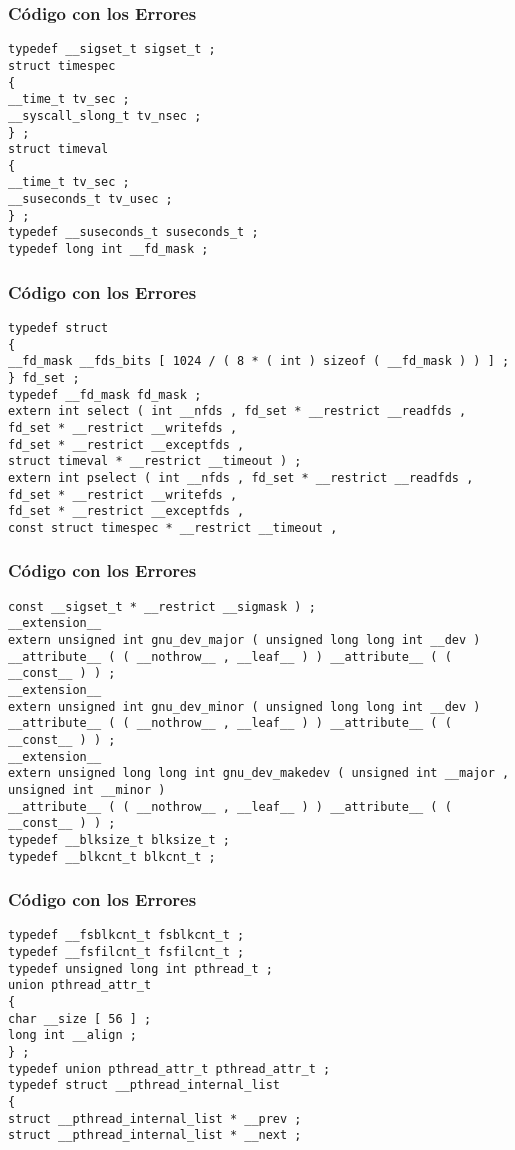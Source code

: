 \documentclass{beamer}
\begin{document}
\begin{frame}[fragile]
\frametitle{C\'odigo con los Errores}
\begin{lstlisting}[style=CStyle]
typedef __sigset_t sigset_t ; 
struct timespec 
{ 
__time_t tv_sec ; 
__syscall_slong_t tv_nsec ; 
} ; 
struct timeval 
{ 
__time_t tv_sec ; 
__suseconds_t tv_usec ; 
} ; 
typedef __suseconds_t suseconds_t ; 
typedef long int __fd_mask ; 
\end{lstlisting}
\end{frame}
\begin{frame}[fragile]
\frametitle{C\'odigo con los Errores}
\begin{lstlisting}[style=CStyle]
typedef struct 
{ 
__fd_mask __fds_bits [ 1024 / ( 8 * ( int ) sizeof ( __fd_mask ) ) ] ; 
} fd_set ; 
typedef __fd_mask fd_mask ; 
extern int select ( int __nfds , fd_set * __restrict __readfds , 
fd_set * __restrict __writefds , 
fd_set * __restrict __exceptfds , 
struct timeval * __restrict __timeout ) ; 
extern int pselect ( int __nfds , fd_set * __restrict __readfds , 
fd_set * __restrict __writefds , 
fd_set * __restrict __exceptfds , 
const struct timespec * __restrict __timeout , 
\end{lstlisting}
\end{frame}
\begin{frame}[fragile]
\frametitle{C\'odigo con los Errores}
\begin{lstlisting}[style=CStyle]
const __sigset_t * __restrict __sigmask ) ; 
__extension__ 
extern unsigned int gnu_dev_major ( unsigned long long int __dev ) 
__attribute__ ( ( __nothrow__ , __leaf__ ) ) __attribute__ ( ( __const__ ) ) ; 
__extension__ 
extern unsigned int gnu_dev_minor ( unsigned long long int __dev ) 
__attribute__ ( ( __nothrow__ , __leaf__ ) ) __attribute__ ( ( __const__ ) ) ; 
__extension__ 
extern unsigned long long int gnu_dev_makedev ( unsigned int __major , 
unsigned int __minor ) 
__attribute__ ( ( __nothrow__ , __leaf__ ) ) __attribute__ ( ( __const__ ) ) ; 
typedef __blksize_t blksize_t ; 
typedef __blkcnt_t blkcnt_t ; 
\end{lstlisting}
\end{frame}
\begin{frame}[fragile]
\frametitle{C\'odigo con los Errores}
\begin{lstlisting}[style=CStyle]
typedef __fsblkcnt_t fsblkcnt_t ; 
typedef __fsfilcnt_t fsfilcnt_t ; 
typedef unsigned long int pthread_t ; 
union pthread_attr_t 
{ 
char __size [ 56 ] ; 
long int __align ; 
} ; 
typedef union pthread_attr_t pthread_attr_t ; 
typedef struct __pthread_internal_list 
{ 
struct __pthread_internal_list * __prev ; 
struct __pthread_internal_list * __next ; 
\end{lstlisting}
\end{frame}
\end{document}
